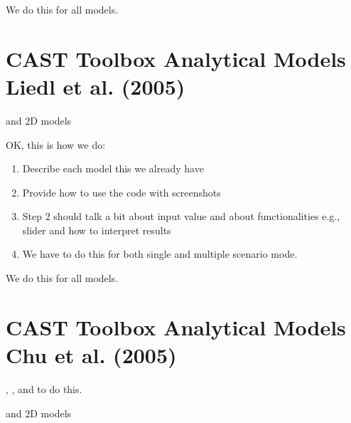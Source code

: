 \documentclass[letterpaper,10pt,english]{sphinxmanual}
\begin{document}
\sphinxAtStartPar
We do this for all models.


\section{CAST Toolbox \sphinxhyphen{} Analytical Models \sphinxhyphen{} Liedl et al. (2005)}
\label{\detokenize{contents/toolbox/an_model/liedl2005:cast-toolbox-analytical-models-liedl-et-al-2005}}\label{\detokenize{contents/toolbox/an_model/liedl2005::doc}}
\sphinxAtStartPar
{} and  \sphinxhyphen{} 2D models

\sphinxAtStartPar
OK, this is how we do:
\begin{enumerate}
%
\item {} 
\sphinxAtStartPar
Describe each model \sphinxhyphen{} this we already have

\item {} 
\sphinxAtStartPar
Provide how to use the code with screenshots

\item {} 
\sphinxAtStartPar
Step 2 should talk a bit about input value and about functionalities \sphinxhyphen{} e.g., slider and how to interpret results

\item {} 
\sphinxAtStartPar
We have to do this for both single and multiple scenario mode.

\end{enumerate}

\sphinxAtStartPar
We do this for all models.


\section{CAST Toolbox \sphinxhyphen{} Analytical Models \sphinxhyphen{} Chu et al. (2005)}
\label{\detokenize{contents/toolbox/an_model/chu2005:cast-toolbox-analytical-models-chu-et-al-2005}}\label{\detokenize{contents/toolbox/an_model/chu2005::doc}}
\sphinxAtStartPar
{}, ,  and  to do this.

\sphinxAtStartPar
{} and  \sphinxhyphen{} 2D models
\end{document}
